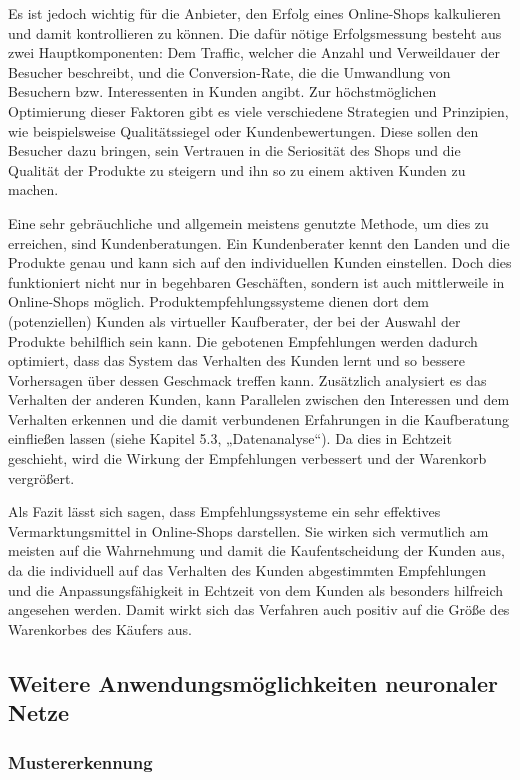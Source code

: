 \documentclass[twoside,a4paper]{article}
\begin{document}
Es ist jedoch wichtig für die Anbieter, den Erfolg eines Online-Shops kalkulieren und damit kontrollieren zu können. Die dafür nötige Erfolgsmessung besteht aus zwei Hauptkomponenten: Dem Traffic, welcher die Anzahl und Verweildauer der Besucher beschreibt, und die Conversion-Rate, die die Umwandlung von Besuchern bzw. Interessenten in Kunden angibt. Zur höchstmöglichen Optimierung dieser Faktoren gibt es viele verschiedene Strategien und Prinzipien, wie beispielsweise Qualitätssiegel oder Kundenbewertungen. Diese sollen den Besucher dazu bringen, sein Vertrauen in die Seriosität des Shops und die Qualität der Produkte zu steigern und ihn so zu einem aktiven Kunden zu machen.

Eine sehr gebräuchliche und allgemein meistens genutzte Methode, um dies zu erreichen, sind Kundenberatungen. Ein Kundenberater kennt den Landen und die Produkte genau und kann sich auf den individuellen Kunden einstellen. Doch dies funktioniert nicht nur in begehbaren Geschäften, sondern ist auch mittlerweile in Online-Shops möglich. Produktempfehlungssysteme dienen dort dem (potenziellen) Kunden als virtueller Kaufberater, der bei der Auswahl der Produkte behilflich sein kann. Die gebotenen Empfehlungen werden dadurch optimiert, dass das System das Verhalten des Kunden lernt und so bessere Vorhersagen über dessen Geschmack treffen kann. Zusätzlich analysiert es das Verhalten der anderen Kunden,  kann Parallelen zwischen den Interessen und dem Verhalten erkennen und die damit verbundenen Erfahrungen in die Kaufberatung einfließen lassen (siehe Kapitel 5.3, „Datenanalyse“). Da dies in Echtzeit geschieht, wird die Wirkung der Empfehlungen verbessert und der Warenkorb vergrößert.

Als Fazit lässt sich sagen, dass Empfehlungssysteme ein sehr effektives Vermarktungsmittel in Online-Shops darstellen. Sie wirken sich vermutlich am meisten auf die Wahrnehmung und damit die Kaufentscheidung der Kunden aus, da die individuell auf das Verhalten des Kunden abgestimmten Empfehlungen und die Anpassungsfähigkeit in Echtzeit von dem Kunden als besonders hilfreich angesehen werden. Damit wirkt sich das Verfahren auch positiv auf die Größe des Warenkorbes des Käufers aus.

\subsection{Weitere Anwendungsmöglichkeiten neuronaler Netze}

\subsubsection{Mustererkennung}
\end{document}
